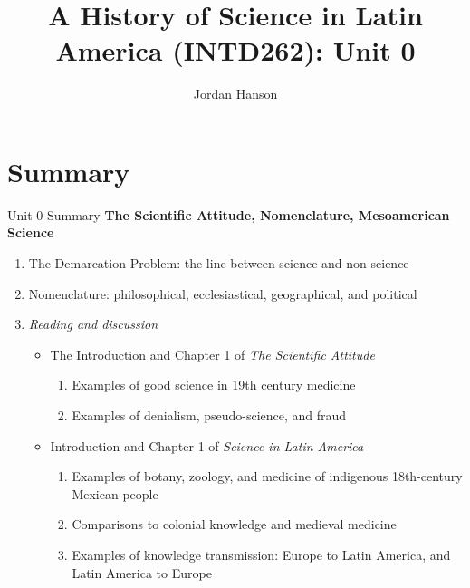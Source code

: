 \documentclass{beamer}
\title{A History of Science in Latin America (INTD262): Unit 0}
\author{Jordan Hanson}
\institute{Whittier College Department of Physics and Astronomy}
\begin{document}
\maketitle

\section{Summary}

\begin{frame}{Unit 0 Summary}
\footnotesize
\textbf{The Scientific Attitude, Nomenclature, Mesoamerican Science}
\begin{enumerate}
\item The Demarcation Problem: the line between science and non-science
\item Nomenclature: philosophical, ecclesiastical, geographical, and political
\item \textit{Reading and discussion}
\begin{itemize}
\footnotesize
\item \alert{The Introduction and Chapter 1 of \textit{The Scientific Attitude}}
\begin{enumerate}
\item Examples of good science in 19th century medicine
\item Examples of denialism, pseudo-science, and fraud
\end{enumerate}
\item \alert{Introduction and Chapter 1 of \textit{Science in Latin America}}
\begin{enumerate}
\item Examples of botany, zoology, and medicine of indigenous 18th-century Mexican people
\item Comparisons to colonial knowledge and medieval medicine
\item Examples of knowledge transmission: Europe to Latin America, and Latin America to Europe
\end{enumerate}
\end{itemize}
\end{enumerate}
\end{frame}
\end{document}
